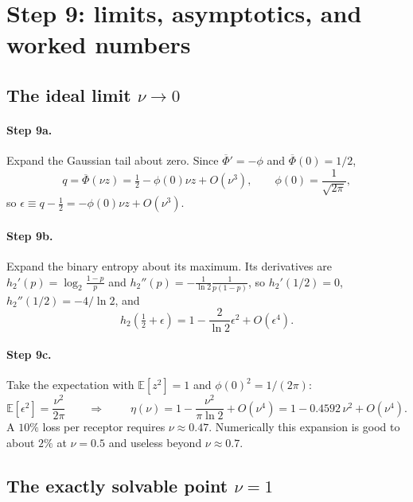 \documentclass[11pt,a4paper]{article}
\newcommand{\EE}{\mathbb{E}}
\newcommand{\Phibar}{\overline{\Phi}}
\newcommand{\htwo}{h_2}
\begin{document}
\section{Step 9: limits, asymptotics, and worked numbers}
\label{sec:limits}

\subsection{The ideal limit $\nu\to0$}

\paragraph{Step 9a.} Expand the Gaussian tail about zero. Since $\Phibar'=-\phi$ and
$\Phibar(0)=1/2$,
\begin{equation}
  q=\Phibar(\nu z)=\tfrac12-\phi(0)\nu z+O(\nu^3),
  \qquad \phi(0)=\frac{1}{\sqrt{2\pi}},
\end{equation}
so $\epsilon\equiv q-\tfrac12=-\phi(0)\nu z+O(\nu^3)$.

\paragraph{Step 9b.} Expand the binary entropy about its maximum. Its derivatives are
$\htwo'(p)=\log_2\frac{1-p}{p}$ and $\htwo''(p)=-\frac{1}{\ln2}\frac{1}{p(1-p)}$, so
$\htwo'(1/2)=0$, $\htwo''(1/2)=-4/\ln2$, and
\begin{equation}
  \htwo\!\left(\tfrac12+\epsilon\right)=1-\frac{2}{\ln2}\epsilon^2+O(\epsilon^4).
\end{equation}

\paragraph{Step 9c.} Take the expectation with $\EE[z^2]=1$ and $\phi(0)^2=1/(2\pi)$:
\begin{equation}
  \EE[\epsilon^2]=\frac{\nu^2}{2\pi}
  \qquad\Longrightarrow\qquad
  \boxed{\;\eta(\nu)=1-\frac{\nu^2}{\pi\ln2}+O(\nu^4)=1-0.4592\,\nu^2+O(\nu^4).}
  \label{eq:smallnu}
\end{equation}
A $10\%$ loss per receptor requires $\nu\approx0.47$. Numerically this expansion is good
to about $2\%$ at $\nu=0.5$ and useless beyond $\nu\approx0.7$.

\subsection{The exactly solvable point $\nu=1$}
\end{document}
